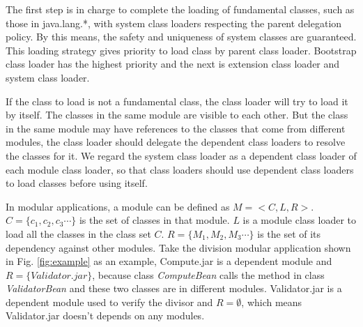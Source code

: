 \documentclass[conference]{IEEEtran}
\begin{document}
The first step is in charge to complete the loading of fundamental classes, such as those in java.lang.*, with system class loaders respecting the parent delegation policy\cite{parent_delegation}. By this means, the safety and uniqueness of system classes are guaranteed. This loading strategy gives priority to load class by parent class loader. Bootstrap class loader has the highest priority and the next is extension class loader and system class loader. 

If the class to load is not a fundamental class, the class loader will try to load it by itself. The classes in the same module are visible to each other. But the class in the same module may have references to the classes that come from different modules, the class loader should delegate the dependent class loaders to resolve the classes for it. We regard the system class loader as a dependent class loader of each module class loader, so that class loaders should use dependent class loaders to load classes before using itself.



In modular applications, a module can be defined as $M=<C, L, R>$. 
$C=\{c_1, c_2, c_3\cdots\}$ is the set of classes in that module. 
$L$ is a module class loader to load all the classes in the class set $C$.
$R=\{M_1, M_2, M_3\cdots\}$ is the set of its dependency against other modules. 
Take the division modular application shown in Fig. \ref{fig:example} as an example, Compute.jar is a dependent module and $R = \{Validator.jar\}$, because class \emph{ComputeBean} calls the method in class \emph{ValidatorBean} and these two classes are in different modules.
Validator.jar is a dependent module used to verify the divisor and $R = \emptyset$, which means Validator.jar doesn't depends on any modules.
\end{document}
